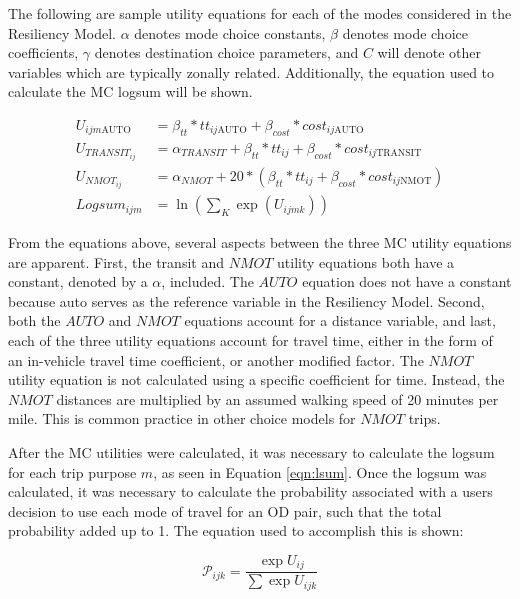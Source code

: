 The following are sample utility equations for each of the modes considered in
the Resiliency Model. $\alpha$ denotes mode choice constants, $\beta$ denotes
mode choice coefficients, $\gamma$ denotes destination choice parameters, and
$C$ will denote other variables which are typically zonally related. Additionally,
the equation used to calculate the MC logsum will be shown.


\begin{align}
U_{ijm\mathrm{AUTO}} &= \beta_{tt} * tt_{ij\mathrm{AUTO}} + \beta_{cost}* cost_{ij\mathrm{AUTO}}\\
U_{{TRANSIT}_{ij}} &= \alpha_{TRANSIT} + \beta_{tt} * tt_{ij} + \beta_{cost} * cost_{ij\mathrm{TRANSIT}}\\
U_{{NMOT}_{ij}} &= \alpha_{NMOT} + 20 * (\beta_{tt{}} * tt_{ij} + \beta_{cost} * cost_{ij\mathrm{NMOT}})\\
Logsum_{ijm} &= \ln(\sum_K \exp (U_{ijmk})) \label{eqn:lsum}
\end{align}

From the equations above, several aspects between the three MC utility equations are
apparent. First, the transit and $NMOT$ utility equations both have a constant, denoted by a $\alpha$,
included. The $AUTO$ equation does not have a constant because auto serves as the reference
variable in the Resiliency Model. Second, both the $AUTO$ and $NMOT$ equations account for a
distance variable, and last, each of the three utility equations account for travel time, either in the
form of an in-vehicle travel time coefficient, or another modified factor. The $NMOT$ utility
equation is not calculated using a specific coefficient for time. Instead, the $NMOT$ distances are
multiplied by an assumed walking speed of 20 minutes per mile. This is common practice in other
choice models for $NMOT$ trips.

After the MC utilities were calculated, it was necessary to calculate the logsum for
each trip purpose \(m\), as seen in Equation \ref{eqn:lsum}. Once the logsum was calculated,
it was necessary to calculate the probability associated with a users decision to use
each mode of travel for an OD pair, such that the total probability added
up to 1. The equation used to accomplish this is shown:

\begin{equation}
	\mathcal{P}_{ijk} = \frac{\exp U_{ij}}{\sum \exp U_{ijk}}
	\label{eqn:prob}
\end{equation}

